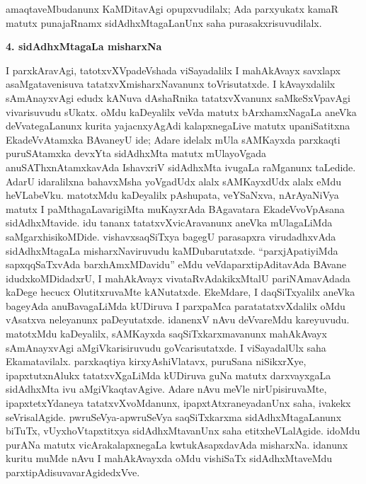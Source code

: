 amaqtaveMbudanunx KaMDitavAgi opupxvudilalx; Ada parxyukatx kamaR matutx punajaRnamx sidAdhxMtagaLanUnx saha purasakxrisuvudilalx.

\smallskip
\begin{center}
{\Large\bf 4. sidAdhxMtagaLa misharxNa}
\end{center}

I parxkAravAgi, tatotxvXVpadeVshada viSayadalilx I mahAkAvayx savxlapx asaMgata\-venisuva tatatxvXmisharxNavanunx toVrisutatxde. I kAvayxdalilx sAmAnayxvAgi edudx kANuva dAshaRnika tatatxvXvanunx saMkeSxVpavAgi vivarisuvudu sUkatx. oMdu kaDeyalilx veVda matutx bArxhamxNagaLa aneVka deVvategaLanunx kurita yajacnxyAgAdi kalapxnegaLive matutx upaniSatitxna EkadeVvAtamxka BAvaneyU ide; Adare idelalx mUla sAMKayxda parxkaqti puruSAtamxka devxYta sidAdhxMta matutx mUlayoVgada anuSAThxnAtamxkavAda IshavxriV sidAdhxMta ivugaLa raMganunx taLedide. AdarU idaralilxna bahavxMsha yoVgadUdx alalx sAMKayxdUdx alalx eMdu heVLabeVku. matotxMdu kaDeyalilx pAshupata, veYSaNxva, nArAyaNiVya matutx I paMthagaLavarigiMta muKayxrAda BAgavatara EkadeVvoVpAsana sidAdhxMtavide. idu tananx tatatxvXvicAravanunx aneVka mUlagaLiMda saMgarxhisikoMDide. vishavxsaqSiTxya bagegU parasapxra virudadhxvAda sidAdhxMtagaLa misharxNaviruvudu kaMDubarutatxde. ``parxjApatiyiMda sapxqqSaTxvAda barxhAmxMDavidu'' eMdu veVdaparxtipAditavAda BAvane idudxkoMDidadxrU, I mahAkAvayx vivataRvAdakikxMtalU pariNAmavAdada kaDege hecucx OlutitxruvaMte kANutatxde. EkeMdare, I daqSiTxyalilx aneVka bageyAda anuBavagaLiMda kUDiruva I parxpaMca paratatatxvXdalilx oMdu vAsatxva neleyanunx paDeyutatxde. idanenxV nAvu deVvareMdu kareyuvudu. matotxMdu kaDeyalilx, sAMKayxda saqSiTxkarxmavanunx mahAkAvayx sAmAnayxvAgi aMgiVkarisiruvudu goVcarisutatxde. I viSayadalUlx saha Ekamatavilalx. parxkaqtiya kirxyAshiVlatavx, puruSana niSikxrXye, ipapxtutxnAlukx tatatxvXgaLiMda kUDiruva guNa matutx darxvayxgaLa sidAdhxMta ivu aMgiVkaqtavAgive. Adare nAvu meVle nirUpisiruvaMte, ipapxtetxYdaneya tatatxvXvoMdanunx, ipapxtAtxraneyadanUnx saha, ivakekx seVrisalAgide. pwruSeVya-apwruSeVya saqSiTxkarxma sidAdhxMtagaLanunx biTuTx, vUyxhoVtapxtitxya sidAdhxMtavanUnx saha etitxheVLalAgide. idoMdu purANa matutx vicArakalapxnegaLa kwtukAsapxdavAda misharxNa. idanunx kuritu muMde nAvu I mahAkAvayxda oMdu vishiSaTx sidAdhxMtaveMdu parxtipAdisuvavarAgidedxVve.

